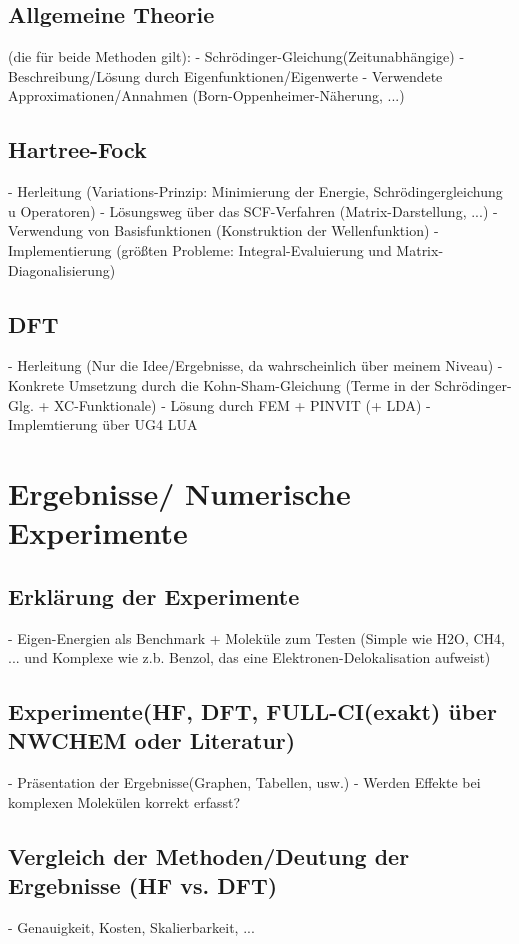 \documentclass[a4paper, 12pt]{report}
\begin{document}
\section{Allgemeine Theorie}
(die für beide Methoden gilt):
- Schrödinger-Gleichung(Zeitunabhängige)
- Beschreibung/Lösung durch Eigenfunktionen/Eigenwerte
- Verwendete Approximationen/Annahmen (Born-Oppenheimer-Näherung, ...)

\section{Hartree-Fock}
- Herleitung (Variations-Prinzip: Minimierung der Energie,
Schrödingergleichung u Operatoren)
- Lösungsweg über das SCF-Verfahren (Matrix-Darstellung, ...)
- Verwendung von Basisfunktionen (Konstruktion der Wellenfunktion)
- Implementierung (größten Probleme: Integral-Evaluierung und
Matrix-Diagonalisierung)

\section{DFT}
- Herleitung (Nur die Idee/Ergebnisse, da wahrscheinlich über
meinem Niveau)
- Konkrete Umsetzung durch die Kohn-Sham-Gleichung (Terme in der
Schrödinger-Glg. + XC-Funktionale)
- Lösung durch FEM + PINVIT (+ LDA)
- Implemtierung über UG4 LUA

\chapter{Ergebnisse/ Numerische Experimente}
\section{Erklärung der Experimente}
- Eigen-Energien als Benchmark + Moleküle zum Testen (Simple wie
H2O, CH4, ... und Komplexe wie z.b. Benzol, das eine
Elektronen-Delokalisation aufweist)

\section{Experimente(HF, DFT, FULL-CI(exakt) über NWCHEM oder Literatur)}
- Präsentation der Ergebnisse(Graphen, Tabellen, usw.)
- Werden Effekte bei komplexen Molekülen korrekt erfasst?

\section{Vergleich der Methoden/Deutung der Ergebnisse (HF vs. DFT)}
- Genauigkeit, Kosten, Skalierbarkeit, ...
\end{document}
